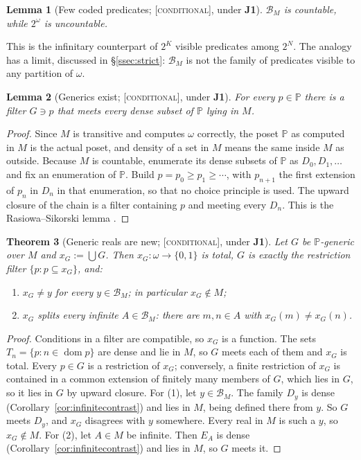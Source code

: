 \documentclass[11pt]{article}
\newcommand{\dom}{\operatorname{dom}}
\newcommand{\Cgen}{\mathbb{P}}                 \newcommand{\Fn}{\operatorname{Fn}}
\newcommand{\gradetag}[1]{\textnormal{\textsc{[#1]}}}
\newcommand{\condg}{\gradetag{conditional}}
\newtheorem{theorem}{Theorem}[section]
\newtheorem{lemma}[theorem]{Lemma}
\theoremstyle{definition}
\begin{document}
\begin{lemma}[Few coded predicates; \condg, under \textbf{J1}]\label{lem:countable}
$\mathcal B_M$ is countable, while $2^\omega$ is uncountable.
\end{lemma}

This is the infinitary counterpart of $2^K$ visible predicates among $2^N$. The analogy has a
limit, discussed in \S\ref{ssec:strict}: $\mathcal B_M$ is not the family of predicates visible to
any partition of $\omega$.

\begin{lemma}[Generics exist; \condg, under \textbf{J1}]\label{lem:RS}
For every $p\in\Cgen$ there is a filter $G\ni p$ that meets every dense subset of $\Cgen$ lying in
$M$.
\end{lemma}

\begin{proof}
Since $M$ is transitive and computes $\omega$ correctly, the poset $\Cgen$ as computed in $M$ is
the actual poset, and density of a set in $M$ means the same inside $M$ as outside. Because $M$ is
countable, enumerate its dense subsets of $\Cgen$ as $D_0,D_1,\dots$ and fix an enumeration of
$\Cgen$. Build $p=p_0\ge p_1\ge\cdots$, with $p_{n+1}$ the first extension of $p_n$ in $D_n$ in that
enumeration, so that no choice principle is used. The upward closure of the chain is a filter
containing $p$ and meeting every $D_n$. This is the Rasiowa--Sikorski lemma
\citep{RasiowaSikorski1950}.
\end{proof}

\begin{theorem}[Generic reals are new; \condg, under \textbf{J1}]\label{thm:novelty}
Let $G$ be $\Cgen$-generic over $M$ and $x_G:=\bigcup G$. Then $x_G\colon\omega\to\{0,1\}$ is
total, $G$ is exactly the restriction filter $\{p:p\subseteq x_G\}$, and:
\begin{enumerate}\itemsep0pt
\item $x_G\ne y$ for every $y\in\mathcal B_M$; in particular $x_G\notin M$;
\item $x_G$ splits every infinite $A\in\mathcal B_M$: there are $m,n\in A$ with $x_G(m)\ne x_G(n)$.
\end{enumerate}
\end{theorem}

\begin{proof}
Conditions in a filter are compatible, so $x_G$ is a function. The sets $T_n=\{p:n\in\dom p\}$ are
dense and lie in $M$, so $G$ meets each of them and $x_G$ is total. Every $p\in G$ is a
restriction of $x_G$; conversely, a finite restriction of $x_G$ is contained in a common extension
of finitely many members of $G$, which lies in $G$, so it lies in $G$ by upward closure. For (1),
let $y\in\mathcal B_M$. The family $D_y$ is dense (Corollary~\ref{cor:infinitecontrast}) and lies in
$M$, being defined there from $y$. So $G$ meets $D_y$, and $x_G$ disagrees with $y$ somewhere. Every
real in $M$ is such a $y$, so $x_G\notin M$. For (2), let $A\in M$ be infinite. Then $E_A$ is dense
(Corollary~\ref{cor:infinitecontrast}) and lies in $M$, so $G$ meets it.
\end{proof}
\end{document}
